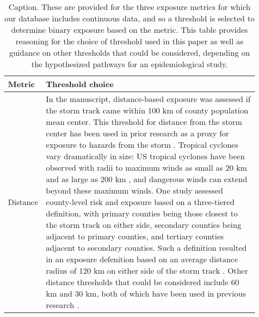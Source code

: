 \begin{longtable}{lp{40em}}
\caption{Caption. These are provided for the three exposure metrics for which our database includes continuous data, and so a threshold is selected to determine binary exposure based on the metric. This table provides reasoning for the choice of threshold used in this paper as well as guidance on other thresholds that could be considered, depending on the hypothesized pathways for an epidemiological study.}
\label{tab:thresholds} \\
\hline
Metric & Threshold choice\\
\hline
Distance & In the manuscript, distance-based exposure was assessed if the storm track came within 100 km of county population mean center. This threshold for distance from the storm center has been used in prior research as a proxy for exposure to hazards from the storm \parencite{grabich2015measuring}. Tropical cyclones vary dramatically in size: US tropical cyclones have been observed with radii to maximum winds as small as 20 km and as large as 200 km \parencite{mallin2006, quiring2011variations}, and dangerous winds can extend beyond these maximum winds. One study \parencite{czajkowski2011} assessed county-level risk and exposure based on a three-tiered definition, with primary counties being those closest to the storm track on either side, secondary counties being adjacent to primary counties, and tertiary counties adjacent to secondary counties. Such a definition resulted in an exposure defenition based on an average distance radius of 120 km on either side of the storm track \parencite{czajkowski2011}. Other distance thresholds that could be considered include 60 km and 30 km, both of which have been used in previous research \parencite{grabich2015measuring, grabich2015, currie2013}.\\

\end{longtable}
